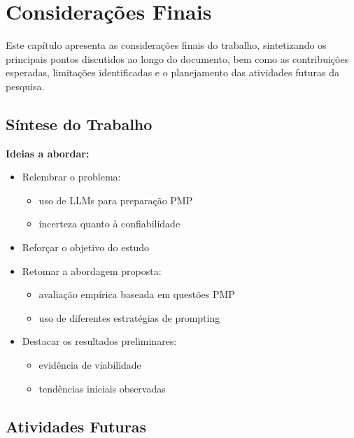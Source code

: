 \chapter{Considerações Finais}
\label{sec:conclusao}

Este capítulo apresenta as considerações finais do trabalho, sintetizando os principais pontos discutidos ao longo do documento, bem como as contribuições esperadas, limitações identificadas e o planejamento das atividades futuras da pesquisa.

\section{Síntese do Trabalho}
\label{subsec:sintese}

\textbf{Ideias a abordar:}
\begin{itemize}
    \item Relembrar o problema:
    \begin{itemize}
        \item uso de LLMs para preparação PMP
        \item incerteza quanto à confiabilidade
    \end{itemize}
    \item Reforçar o objetivo do estudo
    \item Retomar a abordagem proposta:
    \begin{itemize}
        \item avaliação empírica baseada em questões PMP
        \item uso de diferentes estratégias de prompting
    \end{itemize}
    \item Destacar os resultados preliminares:
    \begin{itemize}
        \item evidência de viabilidade
        \item tendências iniciais observadas
    \end{itemize}
\end{itemize}

\section{Atividades Futuras}
\label{subsec:atividades_futuras}

